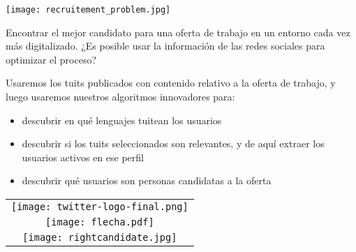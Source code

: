 
\cleardoublepage

\vspace{1cm}



\begin{minipage}{0.5\textwidth}
\texttt{[image: recruitement\_problem.jpg]}
\end{minipage} \hfill
\begin{minipage}{0.45\textwidth}
\medskip

\noindent Encontrar el mejor candidato para una oferta
de trabajo en un entorno cada vez más digitalizado.
¿Es posible usar la información de las redes sociales
para optimizar el proceso?
\end{minipage}
\vspace{1.5cm}


\begin{minipage}{0.7\textwidth}
\medskip

\noindent Usaremos los tuits publicados con contenido relativo 
a la oferta de trabajo, y luego usaremos nuestros algoritmos innovadores para:
\begin{itemize}
\item descubrir en qué lenguajes tuitean los usuarios 
\item descubrir si los tuits seleccionados son relevantes,
y de aquí extraer los usuarios activos en ese perfil
\item descubrir qué usuarios son personas candidatas a la oferta
\end{itemize}
\end{minipage}\hfill
\begin{minipage}{0.4\textwidth}
\begin{tabular}{c}
\texttt{[image: twitter-logo-final.png]}\\
\texttt{[image: flecha.pdf]}\\
\texttt{[image: rightcandidate.jpg]}
\end{tabular}
\end{minipage}
\vspace{1.5cm}


